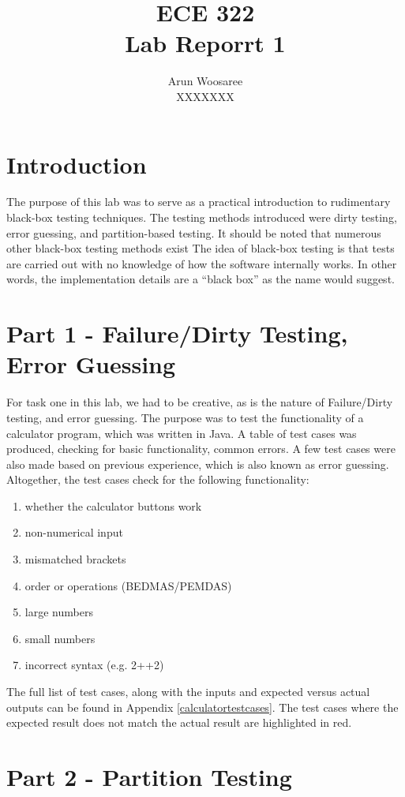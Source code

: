 \documentclass[letterpaper]{article}
\title{ECE 322 \\
Lab Reporrt 1}
\author{Arun Woosaree\\
XXXXXXX}
\begin{document}
 \maketitle 

 \section*{Introduction}
 The purpose of this lab was to serve as a practical introduction to rudimentary black-box testing techniques.
 The testing methods introduced were dirty testing, error guessing, and partition-based testing.
 It should be noted that numerous other black-box testing methods exist
 The idea of black-box testing is that tests are carried out with no knowledge of how the software
 internally works. In other words, the implementation details are a ``black box'' as the name would suggest.

\section*{Part 1 - Failure/Dirty Testing, Error Guessing}
For task one in this lab, we had to be creative, as is the nature of Failure/Dirty testing, and error guessing.
The purpose was to test the functionality of a calculator program, which was written in Java. A table of
test cases was produced, checking for basic functionality, common errors. A few test cases were also 
made based on previous experience, which is also known as error guessing. Altogether, the test cases check
for the following functionality:

\begin{enumerate}
    \item whether the calculator buttons work
    \item non-numerical input
    \item mismatched brackets
    \item order or operations (BEDMAS/PEMDAS)
    \item large numbers
    \item small numbers
    \item incorrect syntax (e.g. 2++2)
\end{enumerate}

The full list of test cases, along with the inputs and expected versus actual outputs can be found in Appendix \ref{calculatortestcases}.
The test cases where the expected result does not match the actual result are highlighted in red.


\section*{Part 2 - Partition Testing}
\end{document}
